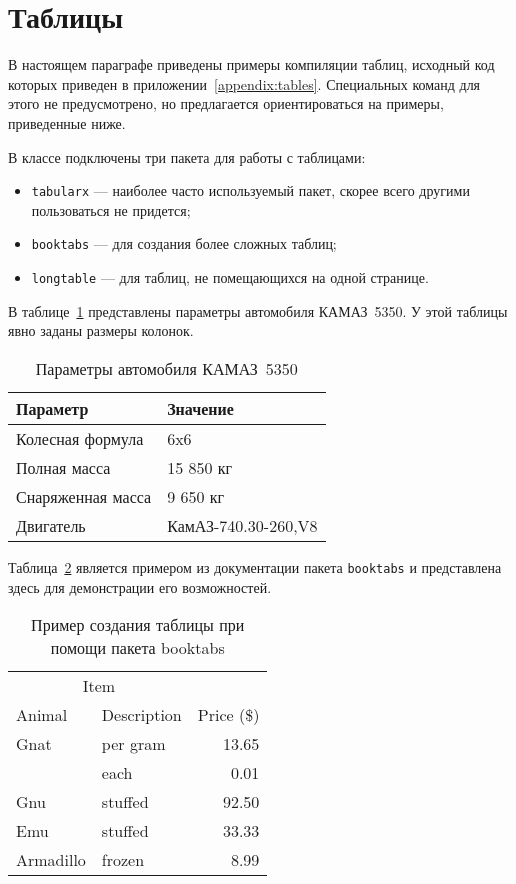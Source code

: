 \section{Таблицы}

В настоящем параграфе приведены примеры компиляции таблиц, исходный код которых
приведен в приложении~\ref{appendix:tables}. Специальных команд для
этого не предусмотрено, но предлагается ориентироваться на примеры, приведенные
ниже.

В классе подключены три пакета для работы с таблицами:
\begin{itemize}
    \item \lstinline$tabularx$ --- наиболее часто используемый пакет, скорее
    всего другими пользоваться не придется; 
    \item \lstinline$booktabs$ --- для создания более сложных таблиц;
    \item \lstinline$longtable$ --- для таблиц, не помещающихся на одной
    странице.
\end{itemize}

В таблице~\ref{table:KAMAZ_5350_params} представлены параметры автомобиля
КАМАЗ~5350. У этой таблицы явно заданы размеры колонок. 

\begin{table}[h]
    \centering
    \caption{Параметры автомобиля КАМАЗ~5350}
 	\label{table:KAMAZ_5350_params}
    \begin{tabular}{|p{7.5cm}|p{8cm}|}                \hline 
		\textbf{Параметр}   & \textbf{Значение}     \\\hline
		Колесная формула    & 6x6                   \\\hline
		Полная масса        & 15 850 кг             \\\hline
		Снаряженная масса   & 9 650 кг              \\\hline
		Двигатель           & КамАЗ-740.30-260,V8   \\\hline
	\end{tabular}
\end{table}

Таблица~\ref{table:booktabs} является примером из документации пакета
\lstinline:booktabs: и представлена здесь для демонстрации его возможностей.

\begin{table}[htb]
	\caption{Пример создания таблицы при помощи пакета booktabs}
    \label{table:booktabs}
    \begin{tabular}{@{}llr@{}} \toprule
        \multicolumn{2}{c}{Item} \\ \cmidrule(r){1-2}
        Animal      & Description   & Price (\$)    \\ \midrule
        Gnat        & per gram      & 13.65         \\
                    & each          & 0.01          \\
        Gnu         & stuffed       & 92.50         \\
        Emu         & stuffed       & 33.33         \\
        Armadillo   & frozen        & 8.99          \\ \bottomrule
    \end{tabular}
\end{table}

